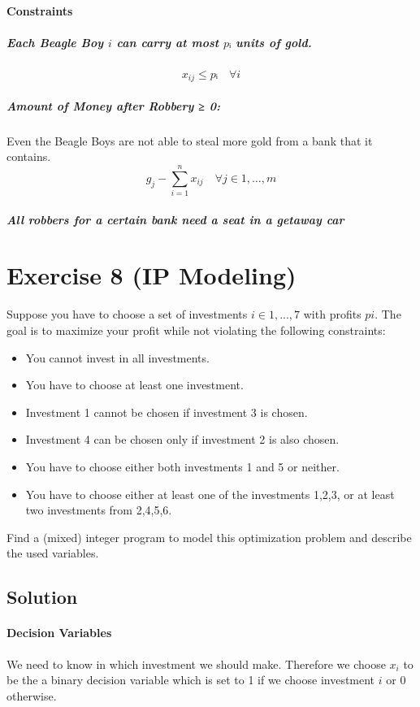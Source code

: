\documentclass[a4paper, 12pt]{report}
\begin{document}
\paragraph{Constraints}

\subparagraph{Each Beagle Boy $i$ can carry at most $pᵢ$ units of gold.}
\[
    x_{ij} ≤ pᵢ \quad ∀i
\]

\subparagraph{Amount of Money after Robbery ≥ 0:} Even the Beagle Boys are not
able to steal more gold from a bank that it contains.
\[
    g_j - ∑_{i=1}^{n} x_{ij} \quad ∀j ∈ {1,…,m}
\]

\subparagraph{All robbers for a certain bank need a seat in a getaway car}

\section{Exercise 8 (IP Modeling)}

Suppose you have to choose a set of investments $i ∈ {1, ..., 7}$ with profits
$pi$. The goal is to maximize your profit while not violating the following
constraints:

\begin{itemize}
    \item You cannot invest in all investments.
    \item You have to choose at least one investment.
    \item Investment 1 cannot be chosen if investment 3 is chosen.
    \item Investment 4 can be chosen only if investment 2 is also chosen.
    \item You have to choose either both investments 1 and 5 or neither.
    \item You have to choose either at least one of the investments 1,2,3, or
          at least two investments from 2,4,5,6.
\end{itemize}

Find a (mixed) integer program to model this optimization problem and describe
the used variables.

\subsection{Solution}

\paragraph{Decision Variables}

We need to know in which investment we should make. Therefore we choose $x_i$
to be the a binary decision variable which is set to 1 if we choose investment
$i$ or 0 otherwise.
\end{document}
